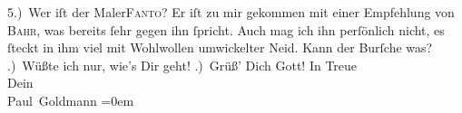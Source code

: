 \begin{ledgroupsized}[t]{13cm}
           5.) Wer iſt der Maler\textsc{Fanto}? Er iſt zu mir gekommen mit einer Empfehlung von \textsc{Bahr}, was bereits ſehr gegen ihn ſpricht. Auch mag ich ihn perſönlich nicht, es
               ſteckt in ihm viel mit Wohlwollen umwickelter Neid. Kann der Burſche was?\pend
           .) Wüßte ich nur, {\pb} wie’s Dir geht!\pend
           .) Grüß’ Dich Gott!\pend
           \pstart
           In Treue {\\[\baselineskip]}Dein {\\[\baselineskip]}\spacefill\mbox{Paul Goldmann}\pend
           \leftskip=0em{}
         
         \endnumbering{}\end{ledgroupsized}  \newcommand{\dateiname}{L02755}\newcommand{\titel}{Paul Goldmann an Arthur Schnitzler, 13. 11. [1895]}\newcommand{\editorInnen}{Martin Anton Müller und Laura Untner}
      
